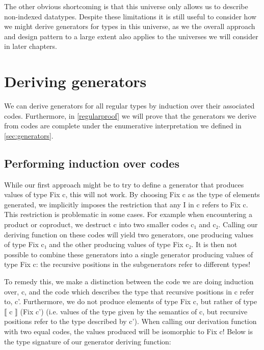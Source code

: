 \documentclass[a4paper,msc,twosized=semi]{uustthesis}
\newcommand{\agda}[1]{{\agdafontinline\color{agdacolor}#1}}
\begin{document}
  The other obvious shortcoming is that this universe only allows us to describe 
  non-indexed datatypes. Despite these limitations it is still useful to consider how 
  we might derive generators for types in this universe, as we the overall approach 
  and design pattern to a large extent also applies to the universes we will consider 
  in later chapters. 

\section{Deriving generators}

  We can derive generators for all regular types by induction over their associated 
  codes. Furthermore, in \cref{regularproof} we will prove that the generators we 
  derive from codes are complete under the enumerative interpretation we defined in 
  \cref{sec:generators}. 

\subsection{Performing induction over codes}

  While our first approach might be to try to define a generator that produces values 
  of type \agda{Fix c}, this will not work. By choosing \agda{Fix c} as the type of elements 
  generated, we implicitly imposes the restriction that any \agda{I} in \agda{c} refers to \agda{Fix 
  c}. This restriction is problematic in some cases. For example when encountering a 
  product or coproduct, we destruct \agda{c} into two smaller codes \agda{c₁} and \agda{c₂}. Calling 
  our deriving function on these codes will yield two generators, one producing values 
  of type \agda{Fix c₁} and the other producing values of type \agda{Fix c₂}. It is then not 
  possible to combine these generators into a single generator producing values of 
  type \agda{Fix c}: the recursive positions in the subgenerators refer to different types!

  To remedy this, we make a distinction between the code we are doing induction over, \agda{
  c}, and the code which describes the type that recursive positions in \agda{c} refer to, \agda{
  c'}. Furthermore, we do not produce elements of type \agda{Fix c}, but rather of type \agda{⟦ 
  c ⟧ (Fix c')} (i.e. values of the type given by the semantics of \agda{c}, but recursive 
  positions refer to the type described by \agda{c'}). When calling our derivation function 
  with two equal codes, the values produced will be isomorphic to \agda{Fix c}! Below is 
  the type signature of our generator deriving function: 
\end{document}
